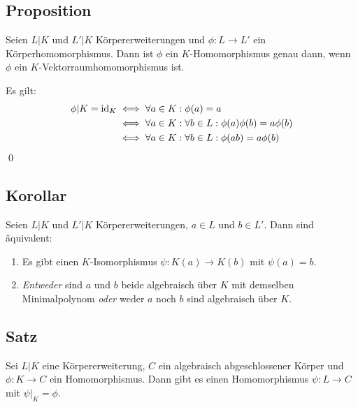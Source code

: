 \subsection{Proposition} Seien $L|K$ und $L'|K$ Körpererweiterungen und $\phi : L \to L'$ ein Körperhomomorphismus. Dann ist $\phi$ ein $K$-Homomorphismus genau dann, wenn $\phi$ ein $K$-Vektorraumhomomorphismus ist.

\proof Es gilt:
\begin{align*}
	\phi|K = \operatorname{id}_K
	& \iff \forall a\in K : \phi(a) = a \\
	& \iff \forall a\in K : \forall b\in L : \phi(a)\phi(b) = a \phi(b) \\
	& \iff \forall a\in K : \forall b\in L : \phi(ab) = a \phi(b)
\end{align*}
\qed

\subsection{Korollar} Seien $L|K$ und $L'|K$ Körpererweiterungen, $a \in L$ und $b \in L'$. Dann sind äquivalent:
\begin{enumerate}[label=(\alph*)]
	\item
		Es gibt einen $K$-Isomorphismus $\psi: K(a) \to K(b)$ mit $\psi(a) = b$.
		
	\item
		\textit{Entweder} sind $a$ und $b$ beide algebraisch über $K$ mit demselben Minimalpolynom \textit{oder} weder $a$ noch $b$ sind algebraisch über $K$.
\end{enumerate}

\subsection{Satz} Sei $L|K$ eine Körpererweiterung, $C$ ein algebraisch abgeschlossener Körper und $\phi: K \to C$ ein Homomorphismus. Dann gibt es einen Homomorphismus $\psi: L \to C$ mit $\psi|_K = \phi$.

\begin{figure}[h]
	\centering
\end{figure}

